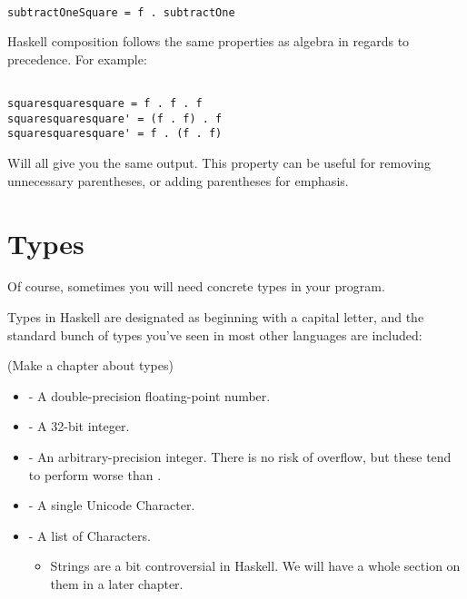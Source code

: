\begin{verbatim}

subtractOneSquare = f . subtractOne

\end{verbatim}

Haskell composition follows the same properties as algebra in regards to precedence.  For example: 

\begin{verbatim}

squaresquaresquare = f . f . f
squaresquaresquare' = (f . f) . f
squaresquaresquare' = f . (f . f)

\end{verbatim}

Will all give you the same output.  This property can be useful for removing unnecessary parentheses, or adding parentheses for emphasis. 

\section{Types}
Of course, sometimes you will need concrete types in your program.  

Types in Haskell are designated as beginning with a capital letter, and the standard bunch of types you've seen in most other languages are included: 

(Make a chapter about types)
\begin{itemize}
\item {} - A double-precision floating-point number. 
\item {} - A 32-bit integer. 
\item {} - An arbitrary-precision integer.  There is no risk of overflow, but these tend to perform worse than . 
\item {} - A single Unicode Character. 
\item {} - A list of Characters. \begin{itemize}
            \item Strings are a bit controversial in Haskell.  We will have a whole section on them in a later chapter. 
	\end{itemize}
\end{itemize}
